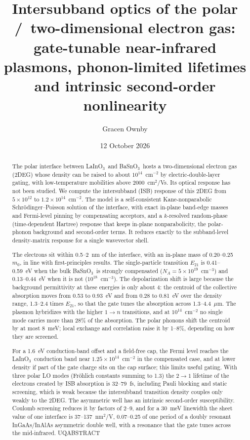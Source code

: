 \documentclass[11pt]{article}
\title{Intersubband optics of the polar \LIO/\BSO\ two-dimensional electron gas: gate-tunable near-infrared plasmons, phonon-limited lifetimes and intrinsic second-order nonlinearity}
\author{Gracen Ownby}
\affil{University of Oklahoma, Norman, Oklahoma, USA}
\date{\small 12 October 2026}
\newcommand{\LIO}{LaInO$_3$}
\newcommand{\BSO}{BaSnO$_3$}
\begin{document}
\maketitle

\begin{abstract}
The polar interface between \LIO\ and \BSO\ hosts a two-dimensional electron gas (2DEG) whose density can be raised to about $10^{14}$~cm$^{-2}$ by electric-double-layer gating, with low-temperature mobilities above 2000~cm$^2$/Vs. Its optical response has not been studied. We compute the intersubband (ISB) response of this 2DEG from $5\times10^{12}$ to $1.2\times10^{14}$~cm$^{-2}$. The model is a self-consistent Kane-nonparabolic Schr\"odinger--Poisson solution of the interface, with exact in-plane band-edge masses and Fermi-level pinning by compensating acceptors, and a $k$-resolved random-phase (time-dependent Hartree) response that keeps in-plane nonparabolicity, the polar-phonon background and second-order terms. It reduces exactly to the subband-level density-matrix response for a single wavevector shell.

The electrons sit within 0.5--2~nm of the interface, with an in-plane mass of 0.20--0.25~$m_0$, in line with first-principles results. The single-particle transition $E_{21}$ is 0.41--0.59~eV when the bulk \BSO\ is strongly compensated ($N_A=5\times10^{19}$~cm$^{-3}$) and 0.13--0.44~eV when it is not ($10^{18}$~cm$^{-3}$). The depolarization shift is large because the background permittivity at these energies is only about 4: the centroid of the collective absorption moves from 0.53 to 0.93~eV and from 0.28 to 0.81~eV over the density range, 1.3--2.4 times $E_{21}$, so that the gate tunes the absorption across 1.3--4.4~$\mu$m. The plasmon hybridizes with the higher $1\to n$ transitions, and at $10^{14}$~cm$^{-2}$ no single mode carries more than 28\% of the absorption. The polar phonons shift the centroid by at most 8~meV; local exchange and correlation raise it by 1--8\%, depending on how they are screened.

For a 1.6~eV conduction-band offset and a field-free cap, the Fermi level reaches the \LIO\ conduction band near $1.25\times10^{14}$~cm$^{-2}$ in the compensated case, and at lower density if part of the gate charge sits on the cap surface; this limits useful gating. With three polar LO modes (Fr\"ohlich constants summing to 1.3) the $2\to1$ lifetime of the electrons created by ISB absorption is 32--79~fs, including Pauli blocking and static screening, which is weak because the intersubband transition density couples only weakly to the 2DEG. The asymmetric well has an intrinsic second-order susceptibility. Coulomb screening reduces it by factors of 2--9, and for a 30~meV linewidth the sheet value of one interface is 37--137~nm$^2$/V, 0.07--0.25 of one period of a doubly resonant InGaAs/InAlAs asymmetric double well, with a resonance that the gate tunes across the mid-infrared. UQABSTRACT
\end{abstract}
\end{document}
